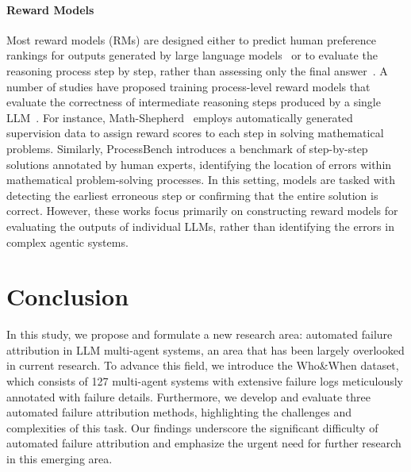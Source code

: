 \paragraph{Reward Models}
Most reward models (RMs) are designed either to predict human preference rankings for outputs generated by large language models~\citep{zhong2025comprehensive} or to evaluate the reasoning process step by step, rather than assessing only the final answer~\citep{wang2023math,zheng2024processbench,lightman2023let,cui2025process}. A number of studies have proposed training process-level reward models that evaluate the correctness of intermediate reasoning steps produced by a single LLM~\citep{lightman2023let, cui2025process}. For instance, Math-Shepherd~\citep{wang2023math} employs automatically generated supervision data to assign reward scores to each step in solving mathematical problems. Similarly, ProcessBench introduces a benchmark of step-by-step solutions annotated by human experts, identifying the location of errors within mathematical problem-solving processes. In this setting, models are tasked with detecting the earliest erroneous step or confirming that the entire solution is correct. However, these works focus primarily on constructing reward models for evaluating the outputs of individual LLMs, rather than identifying the errors in complex agentic systems.  


\section{Conclusion}

In this study, we propose and formulate a new research area: automated failure attribution in LLM multi-agent systems, an area that has been largely overlooked in current research. 
To advance this field, we introduce the Who\&When dataset, which consists of 127 multi-agent systems with extensive failure logs meticulously annotated with failure details.
Furthermore, we develop and evaluate three automated failure attribution methods, highlighting the challenges and complexities of this task. Our findings underscore the significant difficulty of automated failure attribution and emphasize the urgent need for further research in this emerging area. 